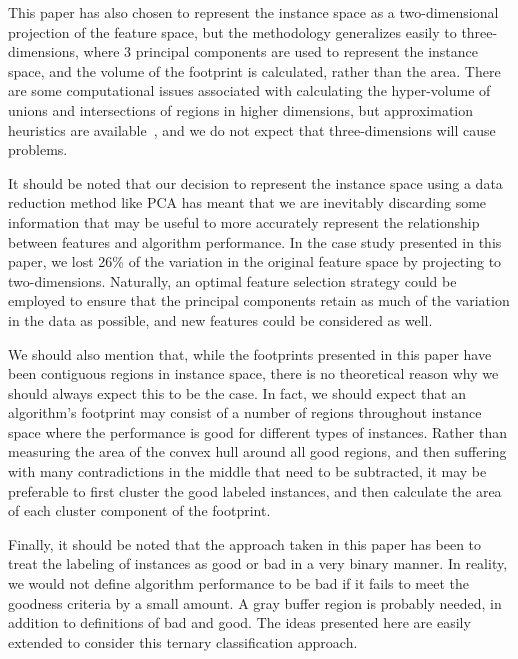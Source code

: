\documentclass[conference]{IEEEtran}
\begin{document}
This paper has also chosen to represent the instance space as a two-dimensional projection of the feature space, but the methodology generalizes easily to three-dimensions, where 3 principal components are used to represent the instance space, and the volume of the footprint is calculated, rather than the area. There are some computational issues associated with calculating the hyper-volume of unions and intersections of regions in higher dimensions, but approximation heuristics are available~\cite{HighDimensionalObjects}, and we do not expect that three-dimensions will cause problems.

It should be noted that our decision to represent the instance space using a data reduction method like PCA has meant that we are inevitably discarding some information that may be useful to more accurately represent the relationship between features and algorithm performance. In the case study presented in this paper, we lost 26\% of the variation in the original feature space by projecting to two-dimensions. Naturally, an optimal feature selection strategy could be employed to ensure that the principal components retain as much of the variation in the data as possible, and new features could be considered as well.

We should also mention that, while the footprints presented in this paper have been contiguous regions in instance space, there is no theoretical reason why we should always expect this to be the case. In fact, we should expect that an algorithm's footprint may consist of a number of regions throughout instance space where the performance is good for different types of instances. Rather than measuring the area of the convex hull around all good regions, and then suffering with many contradictions in the middle that need to be subtracted, it may be preferable to first cluster the good labeled instances, and then calculate the area of each cluster component of the footprint.

Finally, it should be noted that the approach taken in this paper has been to treat the labeling of instances as good or bad in a very binary manner. In reality, we would not define algorithm performance to be bad if it fails to meet the goodness criteria by a small amount. A gray buffer region is probably needed, in addition to definitions of bad and good. The ideas presented here are easily extended to consider this ternary classification approach.
\end{document}
